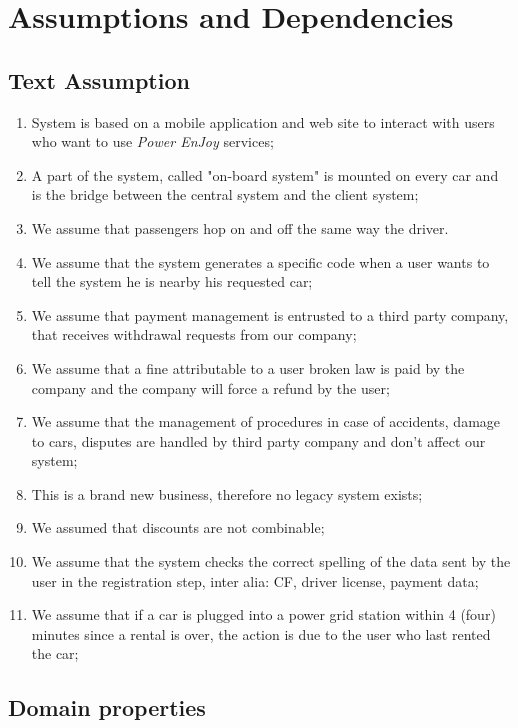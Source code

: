 \documentclass{scrreprt}
\begin{document}
\section{Assumptions and Dependencies}
\subsection{Text Assumption}
\begin{enumerate} [label=TA\arabic*., start=1]
\item System is based on a mobile application and web site to interact with users who want to use \emph{Power EnJoy} services;
\item A part of the system, called "on-board system" is mounted on every car and is the bridge between the central system and the client system;
\item We assume that passengers hop on and off the same way the driver.
\item We assume that the system generates a specific code when a user wants to tell the system he is nearby his requested car;
\item We assume that payment management is entrusted to a third party company, that receives withdrawal requests from our company;
\item We assume that a fine attributable to a user broken law is paid by the company and the company will force a refund by the user;
\item We assume that the management of procedures in case of accidents, damage to cars, disputes are handled by third party company and don't affect our system;
\item This is a brand new business, therefore no legacy system exists;
\item We assumed that discounts are not combinable;
\item We assume that the system checks the correct spelling of the data sent by the user in the registration step, inter alia: CF, driver license, payment data;
\item We assume that if a car is plugged into a power grid station within 4 (four) minutes since a rental is over, the action is due to the user who last rented the car;

\end{enumerate}

\subsection{Domain properties}
\end{document}

